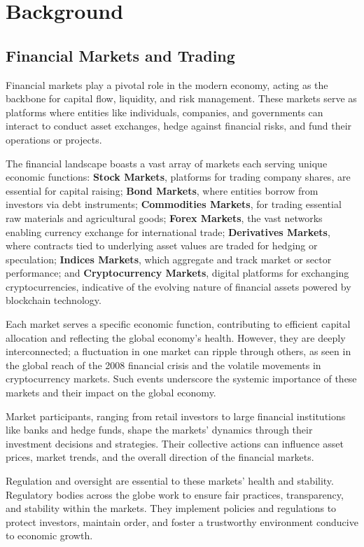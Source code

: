 \section{Background}

\subsection{Financial Markets and Trading}

Financial markets play a pivotal role in the modern economy, acting as the backbone for capital flow, liquidity, and risk management. These markets serve as platforms where entities like individuals, companies, and governments can interact to conduct asset exchanges, hedge against financial risks, and fund their operations or projects.

The financial landscape boasts a vast array of markets each serving unique economic functions: \textbf{Stock Markets}, platforms for trading company shares, are essential for capital raising; \textbf{Bond Markets}, where entities borrow from investors via debt instruments; \textbf{Commodities Markets}, for trading essential raw materials and agricultural goods; \textbf{Forex Markets}, the vast networks enabling currency exchange for international trade; \textbf{Derivatives Markets}, where contracts tied to underlying asset values are traded for hedging or speculation; \textbf{Indices Markets}, which aggregate and track market or sector performance; and \textbf{Cryptocurrency Markets}, digital platforms for exchanging cryptocurrencies, indicative of the evolving nature of financial assets powered by blockchain technology.

Each market serves a specific economic function, contributing to efficient capital allocation and reflecting the global economy's health. However, they are deeply interconnected; a fluctuation in one market can ripple through others, as seen in the global reach of the 2008 financial crisis and the volatile movements in cryptocurrency markets. Such events underscore the systemic importance of these markets and their impact on the global economy.

Market participants, ranging from retail investors to large financial institutions like banks and hedge funds, shape the markets' dynamics through their investment decisions and strategies. Their collective actions can influence asset prices, market trends, and the overall direction of the financial markets.

Regulation and oversight are essential to these markets' health and stability. Regulatory bodies across the globe work to ensure fair practices, transparency, and stability within the markets. They implement policies and regulations to protect investors, maintain order, and foster a trustworthy environment conducive to economic growth.

